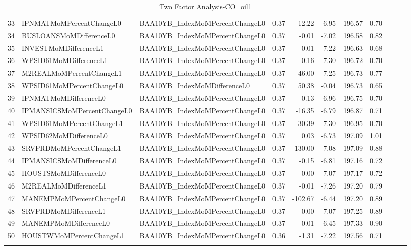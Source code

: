 \begin{longtable}{rllrrrrrlll}
  33 & IPNMATMoMPercentChangeL0 & BAA10YB\_IndexMoMPercentChangeL0 & 0.37 & -12.22 & -6.95 & 196.57 & 0.70 &  &  &  \\ 
  34 & BUSLOANSMoMDifferenceL0 & BAA10YB\_IndexMoMPercentChangeL0 & 0.37 & -0.01 & -7.02 & 196.58 & 0.82 &  &  &  \\ 
  35 & INVESTMoMDifferenceL1 & BAA10YB\_IndexMoMPercentChangeL0 & 0.37 & -0.01 & -7.22 & 196.63 & 0.68 &  &  &  \\ 
  36 & WPSID61MoMDifferenceL1 & BAA10YB\_IndexMoMPercentChangeL0 & 0.37 & 0.16 & -7.30 & 196.72 & 0.70 &  &  &  \\ 
  37 & M2REALMoMPercentChangeL1 & BAA10YB\_IndexMoMPercentChangeL0 & 0.37 & -46.00 & -7.25 & 196.73 & 0.77 &  &  &  \\ 
  38 & WPSID61MoMPercentChangeL0 & BAA10YB\_IndexMoMDifferenceL0 & 0.37 & 50.38 & -0.04 & 196.73 & 0.65 &  &  &  \\ 
  39 & IPNMATMoMDifferenceL0 & BAA10YB\_IndexMoMPercentChangeL0 & 0.37 & -0.13 & -6.96 & 196.75 & 0.70 &  &  &  \\ 
  40 & IPMANSICSMoMPercentChangeL0 & BAA10YB\_IndexMoMPercentChangeL0 & 0.37 & -16.35 & -6.79 & 196.87 & 0.71 &  &  &  \\ 
  41 & WPSID61MoMPercentChangeL1 & BAA10YB\_IndexMoMPercentChangeL0 & 0.37 & 30.39 & -7.30 & 196.95 & 0.70 &  &  &  \\ 
  42 & WPSID62MoMDifferenceL0 & BAA10YB\_IndexMoMPercentChangeL0 & 0.37 & 0.03 & -6.73 & 197.09 & 1.01 &  &  &  \\ 
  43 & SRVPRDMoMPercentChangeL1 & BAA10YB\_IndexMoMPercentChangeL0 & 0.37 & -130.00 & -7.08 & 197.09 & 0.88 &  &  &  \\ 
  44 & IPMANSICSMoMDifferenceL0 & BAA10YB\_IndexMoMPercentChangeL0 & 0.37 & -0.15 & -6.81 & 197.16 & 0.72 &  &  &  \\ 
  45 & HOUSTSMoMDifferenceL0 & BAA10YB\_IndexMoMPercentChangeL0 & 0.37 & -0.00 & -7.07 & 197.17 & 0.72 &  &  &  \\ 
  46 & M2REALMoMDifferenceL1 & BAA10YB\_IndexMoMPercentChangeL0 & 0.37 & -0.01 & -7.26 & 197.20 & 0.79 &  &  &  \\ 
  47 & MANEMPMoMPercentChangeL0 & BAA10YB\_IndexMoMPercentChangeL0 & 0.37 & -102.67 & -6.44 & 197.20 & 0.89 &  &  &  \\ 
  48 & SRVPRDMoMDifferenceL1 & BAA10YB\_IndexMoMPercentChangeL0 & 0.37 & -0.00 & -7.07 & 197.25 & 0.89 &  &  &  \\ 
  49 & MANEMPMoMDifferenceL0 & BAA10YB\_IndexMoMPercentChangeL0 & 0.37 & -0.01 & -6.45 & 197.33 & 0.90 &  &  &  \\ 
  50 & HOUSTWMoMPercentChangeL1 & BAA10YB\_IndexMoMPercentChangeL0 & 0.36 & -1.31 & -7.22 & 197.56 & 0.71 &  &  &  \\ 
   \hline
\hline
\caption{Two Factor Analysis-CO_oil1} 
\end{longtable}
